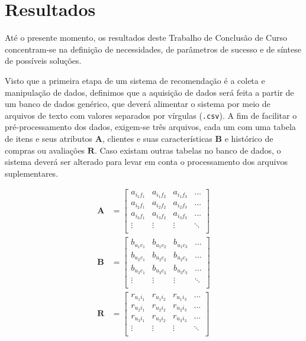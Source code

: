 \chapter[Resultados]{Resultados}
\label{chap:resultados}

Até o presente momento, os resultados deste Trabalho de Conclusão de Curso concentram-se na definição de necessidades, de parâmetros de sucesso e de síntese de possíveis soluções. 

Visto que a primeira etapa de um sistema de recomendação é a coleta e manipulação de dados, definimos que a aquisição de dados será feita a partir de um banco de dados genérico, que deverá alimentar o sistema por meio de arquivos de texto com valores separados por vírgulas (\texttt{.csv}). A fim de facilitar o pré-processamento dos dados, exigem-se três arquivos, cada um com uma tabela de itens e seus atributos $\mathbf{A}$, clientes e suas características $\mathbf{B}$ e histórico de compras ou avaliações $\mathbf{R}$. Caso existam outras tabelas no banco de dados, o sistema deverá ser alterado para levar em conta o processamento dos arquivos suplementares.

\begin{equation} 
\begin{split} 
\mathbf{A} &= 
\begin{bmatrix} 
 a_{i_1 f_1} &  a_{i_1 f_2} &  a_{i_1 f_3}  & \dots   \\
 a_{i_2 f_1} &  a_{i_2 f_2} &  a_{i_2 f_3}  & \dots   \\
 a_{i_3 f_1} &  a_{i_3 f_2} &  a_{i_3 f_3}  & \dots  \\ 
 \vdots &  \vdots &  \vdots  & \ddots   \\
 \end{bmatrix} \\
\mathbf{B} &= 
\begin{bmatrix} 
 b_{u_1 c_1} &  b_{u_1 c_2} &  b_{u_1 c_3}  & \dots   \\
 b_{u_2 c_1} &  b_{u_2 c_2} &  b_{u_2 c_3}  & \dots   \\
 b_{u_3 c_1} &  b_{u_3 c_2} &  b_{u_3 c_3}  & \dots  \\ 
 \vdots &  \vdots &  \vdots  & \ddots   \\
 \end{bmatrix}\\
  \mathbf{R} &= 
\begin{bmatrix} 
  r_{u_1 i_1} &  r_{u_1 i_2} &  r_{u_1 i_3}  & \dots   \\
 r_{u_2 i_1} &  r_{u_2 i_2} &  r_{u_2 i_3}  & \dots   \\
 r_{u_3 i_1} &  r_{u_3 i_2} &  r_{u_3 i_3}  & \dots  \\ 
 \vdots &  \vdots &  \vdots  & \ddots   \\
\end{bmatrix}
\end{split} 
\end{equation}

